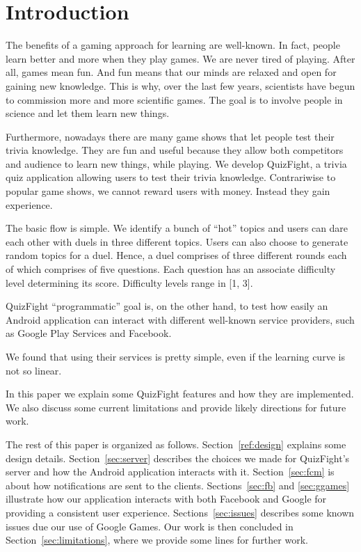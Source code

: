 \section{Introduction}

The benefits of a gaming approach for learning are well-known. In fact,
people learn better and more when they play games. We are never tired of
playing.
After all, games mean fun. And fun means that our minds are relaxed and open
for gaining new knowledge.
This is why, over the last few years, scientists have begun to commission
more and more scientific games.
The goal is to involve people in science and let them learn new things.

Furthermore, nowadays there are many game shows that let people test their
trivia knowledge.
They are fun and useful because they allow both competitors and audience to
learn new things, while playing.
We develop QuizFight, a trivia quiz application allowing users to test their
trivia knowledge.
Contrariwise to popular game shows, we cannot reward users with money.
Instead they gain experience. 

The basic flow is simple. We identify a bunch of ``hot'' topics and users can
dare each other with duels in three different topics.
Users can also choose to generate random topics for a duel.
Hence, a duel comprises of three different rounds each of which comprises
of five questions.
Each question has an associate difficulty level determining its score.
Difficulty levels range in [1, 3].

QuizFight ``programmatic'' goal is, on the other hand, to test how easily an
Android application can interact with different well-known service providers,
such as Google Play Services and Facebook.

We found that using their services is pretty simple, even if the learning curve
is not so linear.

In this paper we explain some QuizFight features and how they are
implemented.
We also discuss some current limitations and provide likely directions for
future work. 

The rest of this paper is organized as follows. Section~\ref{ref:design} explains
some design details. Section~\ref{sec:server} describes the choices we made for
QuizFight's server and how the Android application interacts with it. 
Section~\ref{sec:fcm} is about how notifications are sent to the clients.
Sections~\ref{sec:fb} and \ref{sec:ggames} illustrate how our application
interacts with both Facebook and Google for providing a consistent user
experience. Sections~\ref{sec:issues} describes some known issues due 
our use of Google Games. Our work is then concluded in Section~\ref{sec:limitations},
where we provide some lines for further work.
